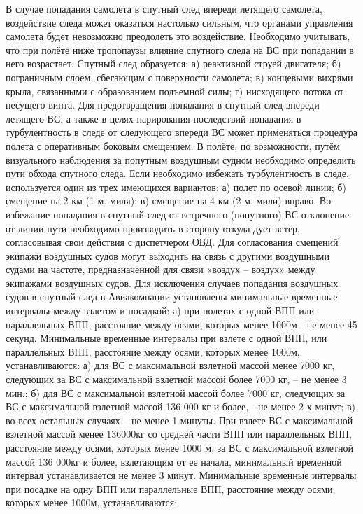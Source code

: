 В случае попадания самолета в спутный след впереди летящего самолета, воздействие следа может оказаться настолько сильным, что органами управления самолета будет невозможно преодолеть это воздействие. 
Необходимо учитывать, что при полёте ниже тропопаузы влияние спутного следа на ВС при попадании в него возрастает. 
Спутный след образуется: 
а)	реактивной струей двигателя; 
б)	пограничным слоем, сбегающим с поверхности самолета; 
в)	концевыми вихрями крыла, связанными с образованием подъемной силы; 
г)	нисходящего потока от несущего винта. 
Для предотвращения попадания в спутный след впереди летящего ВС, а также в целях парирования последствий попадания в турбулентность в следе от следующего впереди ВС может применяться процедура полета с оперативным боковым смещением. 
В полёте, по возможности, путём визуального наблюдения за попутным воздушным судном необходимо определить пути обхода спутного следа. 
Если необходимо избежать турбулентность в следе, используется один из трех имеющихся вариантов: 
а)	полет по осевой линии; 
б)	смещение на 2 км (1 м. миля); 
в)	смещение на 4 км (2 м. мили) вправо. 
Во избежание попадания в спутный след от встречного (попутного) ВС отклонение от линии пути необходимо производить в сторону откуда дует ветер, согласовывая свои действия с диспетчером ОВД. 
Для согласования смещений экипажи воздушных судов могут выходить на связь с другими воздушными судами на частоте, предназначенной для связи «воздух – воздух» между экипажами воздушных судов. 
Для исключения случаев попадания воздушных судов в спутный след в Авиакомпании установлены минимальные временные интервалы между взлетом и посадкой: 
а)	при полетах с одной ВПП или параллельных ВПП, расстояние между осями, которых менее 1000м - не менее 45 секунд. 
Минимальные временные интервалы при взлете с одной ВПП, или параллельных ВПП, расстояние между осями, которых менее 1000м, устанавливаются: 
а)	для ВС с максимальной взлетной массой менее 7000 кг, следующих за ВС с максимальной взлетной массой более 7000 кг, – не менее 3 мин.; 
б)	для ВС с максимальной взлетной массой более 7000 кг, следующих за ВС с максимальной взлетной массой 136 000 кг и более, - не менее 2-х минут; 
в)	во всех остальных случаях – не менее 1 минуты. 
При взлете ВС с максимальной взлетной массой менее 136000кг со средней части ВПП или параллельных ВПП, расстояние между осями, которых менее 1000 м, за ВС с максимальной взлетной массой 136 000кг и более, взлетающим от ее начала, минимальный временной интервал устанавливается не менее 3 минут. 
Минимальные временные интервалы при посадке на одну ВПП или параллельные ВПП, расстояние между осями, которых менее 1000м, устанавливаются: 
